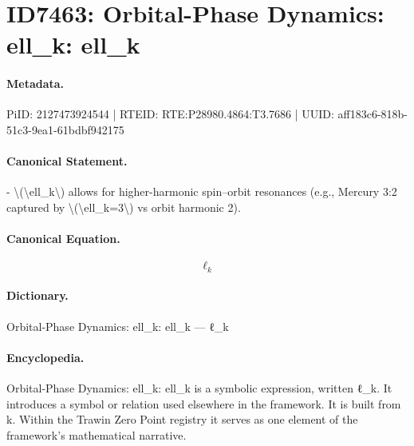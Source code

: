 \section*{ID7463: Orbital-Phase Dynamics: ell\_k: ell\_k}
\paragraph{Metadata.}
PiID: 2127473924544 | RTEID: RTE:P28980.4864:T3.7686 | UUID: aff183c6-818b-51c3-9ea1-61bdbf942175

\paragraph{Canonical Statement.}
- \textbackslash{}(\textbackslash{}ell\_k\textbackslash{}) allows for higher-harmonic spin–orbit resonances (e.g., Mercury 3:2 captured by \textbackslash{}(\textbackslash{}ell\_k=3\textbackslash{}) vs orbit harmonic 2).

\paragraph{Canonical Equation.}
\[
\ell_k
\]

\paragraph{Dictionary.}
Orbital-Phase Dynamics: ell\_k: ell\_k — ℓ\_k

\paragraph{Encyclopedia.}
Orbital-Phase Dynamics: ell\_k: ell\_k is a symbolic expression, written ℓ\_k. It introduces a symbol or relation used elsewhere in the framework. It is built from k. Within the Trawin Zero Point registry it serves as one element of the framework's mathematical narrative.
